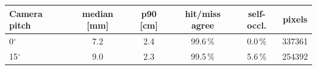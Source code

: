 \begin{tabular}{lccccc}\toprule
Camera pitch & median [mm] & p90 [cm] & hit/miss agree & self-occl. & pixels\\\midrule
0$^\circ$ & 7.2 & 2.4 & 99.6\,\% & 0.0\,\% & 337361\\
15$^\circ$ & 9.0 & 2.3 & 99.5\,\% & 5.6\,\% & 254392\\
\bottomrule\end{tabular}
